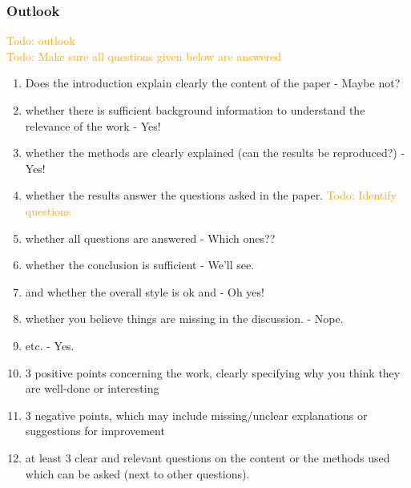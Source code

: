 \documentclass[letterpaper]{article}
\newcommand\todo[1]{\textcolor{orange}{Todo: #1}}
\begin{document}
\subsubsection{Outlook}
\todo{outlook}
\\\todo{Make sure all questions given below are answered}
\begin{enumerate}
 \item Does the introduction explain clearly the content of the paper - Maybe not?
 \item whether there is sufficient background information to understand the relevance of the work - Yes!
 \item whether the methods are clearly explained (can the results be reproduced?) - Yes!
 \item whether the results answer the questions asked in the paper. \todo{Identify questions}
 \item whether all questions are answered - Which ones??
 \item whether the conclusion is sufficient - We'll see.
 \item and whether the overall style is ok and - Oh yes!
 \item whether you believe things are missing in the discussion. - Nope.
 \item etc. - Yes.
 \item 3 positive points concerning the work, clearly specifying why you think they are well-done or interesting
 \item 3 negative points, which may include missing/unclear explanations or suggestions for improvement
 \item at least 3 clear and relevant questions on the content or the methods used which can be asked (next to other questions).
\end{enumerate}

\footnotesize


\end{document}
